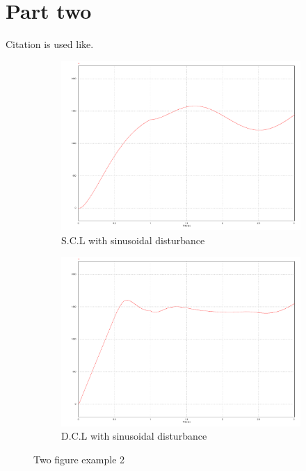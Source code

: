 \documentclass[11pt,english, openany]{book}
\begin{document}
\chapter{Part two}
Citation is used like\cite{ex}.

\begin{figure}[H]
	\centering
	\begin{subfigure}{0.49\linewidth} \centering
		\includegraphics[scale=0.25]{Figures/single_sine_perturb}
		\caption{S.C.L with sinusoidal disturbance}\label{fig:figA}
	\end{subfigure}
	\begin{subfigure}{0.49\linewidth} \centering
		\includegraphics[scale=0.25]{Figures/dual_sine_perturb}
		\caption{D.C.L with sinusoidal disturbance}\label{fig:figB}
	\end{subfigure}
	\caption{Two figure example 2} \label{fig:twodisturb}
\end{figure}
\end{document}
